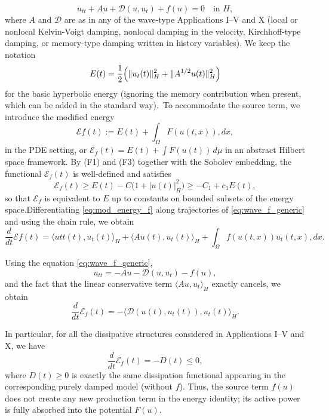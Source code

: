 \documentclass[11pt,reqno]{amsart}
\theoremstyle{remark}
\begin{document}
    \begin{equation}\label{eq:wave_f_generic}
    u_{tt} + Au + \mathcal{D}(u,u_t) + f(u)=0 \quad\text{in } H,
    \end{equation}where $A$ and $\mathcal{D}$ are as in any of the wave-type Applications I--V and X (local or nonlocal Kelvin-Voigt damping, nonlocal damping in the velocity, Kirchhoff-type damping, or memory-type damping written in history variables). We keep the notation$$E(t) = \frac{1}{2}\Bigl(\|u_t(t)\|_H^2 + \|A^{1/2}u(t)\|_H^2\Bigr)$$
    for the basic hyperbolic energy (ignoring the memory contribution when present, which can be added in the standard way).~To accommodate the source term, we introduce the modified energy
    \begin{equation}\label{eq:mod_energy_f}
    \mathcal{E}f(t) := E(t) + \int_\Omega F(u(t,x)),dx,
    \end{equation}in the PDE setting, or $\mathcal{E}_f(t)=E(t)+\int F(u(t))\,d\mu$ in an abstract Hilbert space framework. By (F1) and (F3) together with the Sobolev embedding, the functional $\mathcal{E}_f(t)$ is well-defined and satisfies
    \begin{equation}\label{eq:energy_equivalence}
    \mathcal{E}_f(t) \ge E(t) - C\bigl(1+|u(t)|_H^2\bigr) \ge -C_1 + c_1 E(t),
    \end{equation}so that $\mathcal{E}_f$ is equivalent to $E$ up to constants on bounded subsets of the energy space.Differentiating \eqref{eq:mod_energy_f} along trajectories of \eqref{eq:wave_f_generic} and using the chain rule, we obtain
    \begin{equation}\label{eq:mod_energy_derivative}
    \frac{d}{dt}\mathcal{E}f(t) = \bigl\langle u{tt}(t), u_t(t)\bigr\rangle_H + \bigl\langle Au(t),u_t(t)\bigr\rangle_H + \int_\Omega f(u(t,x))u_t(t,x),dx.
    \end{equation}

    Using the equation \eqref{eq:wave_f_generic},
    $$u_{tt} = -Au - \mathcal{D}(u,u_t) - f(u),$$
    and the fact that the linear conservative term $\langle Au,u_t\rangle_H$ exactly cancels, we obtain
    $$\frac{d}{dt}\mathcal{E}_f(t) = -\bigl\langle \mathcal{D}(u(t),u_t(t)),u_t(t)\bigr\rangle_H.$$

    In particular, for all the dissipative structures considered in Applications I--V and X, we have\begin{equation}\label{eq:Ef_diss}
    \frac{d}{dt}\mathcal{E}_f(t) = -D(t)\le 0,
    \end{equation}
    where $D(t)\ge 0$ is exactly the same dissipation functional appearing in the corresponding purely damped model (without $f$). Thus, the source term $f(u)$ does not create any new production term in the energy identity; its active power is fully absorbed into the potential $F(u)$.
\end{document}
